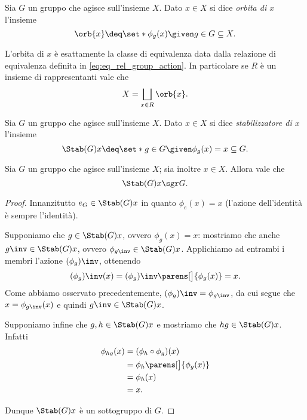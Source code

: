 \begin{definition}[Orbita]
    Sia $G$ un gruppo che agisce sull'insieme $X$. Dato $x \in X$ si dice \emph{orbita di $x$} l'insieme \[
        \orb{x} \deq \set*{\phi_g(x) \given g \in G} \subseteq X.    
    \]
\end{definition}

\begin{remark}
    L'orbita di $x$ è esattamente la classe di equivalenza data dalla relazione di equivalenza definita in \eqref{eq:eq_rel_group_action}. In particolare se $R$ è un insieme di rappresentanti vale che \[
        X = \bigsqcup_{x \in R} \orb{x}.    
    \]
\end{remark}

\begin{definition}[Stabilizzatore]
    Sia $G$ un gruppo che agisce sull'insieme $X$. Dato $x \in X$ si dice \emph{stabilizzatore di $x$} l'insieme \[
        \Stab(G){x} \deq \set*{g \in G \given \phi_g(x) = x} \subseteq G.    
    \]
\end{definition}

\begin{proposition}
    Sia $G$ un gruppo che agisce sull'insieme $X$; sia inoltre $x \in X$. Allora vale che \[
        \Stab(G){x} \sgr G.    
    \]
\end{proposition}
\begin{proof}
    Innanzitutto $e_G \in \Stab(G){x}$ in quanto $\phi_e(x) = x$ (l'azione dell'identità è sempre l'identità).

    Supponiamo che $g \in \Stab(G){x}$, ovvero $\phi_g(x) = x$: mostriamo che anche $g\inv \in \Stab(G){x}$, ovvero $\phi_{g\inv} \in \Stab(G){x}$. Applichiamo ad entrambi i membri l'azione $(\phi_g)\inv$, ottenendo \begin{align*}
        (\phi_g)\inv(x) = (\phi_g)\inv\parens[\big]{\phi_g(x)} = x.
    \end{align*} Come abbiamo osservato precedentemente, $(\phi_g)\inv = \phi_{g\inv}$, da cui segue che $x = \phi_{g\inv}(x)$ e quindi $g\inv \in \Stab(G){x}$.

    Supponiamo infine che $g, h \in \Stab(G){x}$ e mostriamo che $hg \in \Stab(G){x}$. Infatti \begin{align*}
        \phi_{hg}(x) &= (\phi_h \circ \phi_g)(x)\\
        &= \phi_h\parens[\big]{\phi_g(x)}\\
        &= \phi_h(x)\\
        &= x.
    \end{align*}

    Dunque $\Stab(G){x}$ è un sottogruppo di $G$.
\end{proof}

